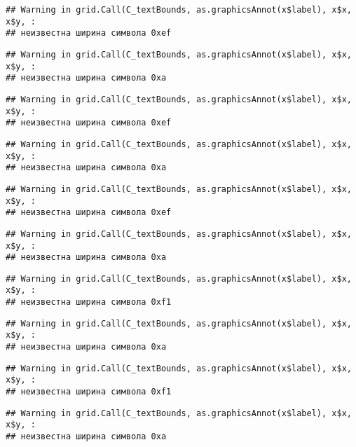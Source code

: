 \documentclass[
]{article}
\begin{document}
\begin{verbatim}
## Warning in grid.Call(C_textBounds, as.graphicsAnnot(x$label), x$x, x$y, :
## неизвестна ширина символа 0xef
\end{verbatim}

\begin{verbatim}
## Warning in grid.Call(C_textBounds, as.graphicsAnnot(x$label), x$x, x$y, :
## неизвестна ширина символа 0xa
\end{verbatim}

\begin{verbatim}
## Warning in grid.Call(C_textBounds, as.graphicsAnnot(x$label), x$x, x$y, :
## неизвестна ширина символа 0xef
\end{verbatim}

\begin{verbatim}
## Warning in grid.Call(C_textBounds, as.graphicsAnnot(x$label), x$x, x$y, :
## неизвестна ширина символа 0xa
\end{verbatim}

\begin{verbatim}
## Warning in grid.Call(C_textBounds, as.graphicsAnnot(x$label), x$x, x$y, :
## неизвестна ширина символа 0xef
\end{verbatim}

\begin{verbatim}
## Warning in grid.Call(C_textBounds, as.graphicsAnnot(x$label), x$x, x$y, :
## неизвестна ширина символа 0xa
\end{verbatim}

\begin{verbatim}
## Warning in grid.Call(C_textBounds, as.graphicsAnnot(x$label), x$x, x$y, :
## неизвестна ширина символа 0xf1
\end{verbatim}

\begin{verbatim}
## Warning in grid.Call(C_textBounds, as.graphicsAnnot(x$label), x$x, x$y, :
## неизвестна ширина символа 0xa
\end{verbatim}

\begin{verbatim}
## Warning in grid.Call(C_textBounds, as.graphicsAnnot(x$label), x$x, x$y, :
## неизвестна ширина символа 0xf1
\end{verbatim}

\begin{verbatim}
## Warning in grid.Call(C_textBounds, as.graphicsAnnot(x$label), x$x, x$y, :
## неизвестна ширина символа 0xa
\end{verbatim}
\end{document}
